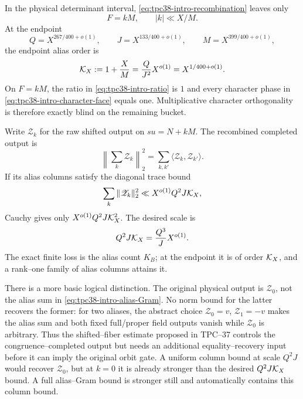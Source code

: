 In the physical determinant interval, \eqref{eq:tpc38-intro-recombination}
leaves only
\begin{equation}
 F=kM,\qquad |k|\ll X/M.
 \label{eq:tpc38-intro-joint-aliases}
\end{equation}
At the endpoint
\begin{equation}
 Q=X^{267/400+o(1)},\qquad
 J=X^{133/400+o(1)},\qquad
 M=X^{399/400+o(1)},
 \label{eq:tpc38-intro-endpoint}
\end{equation}
the endpoint alias order is
\begin{equation}
 \mathcal K_X:=1+\frac XM
 =\frac Q{J^2}X^{o(1)}
 =X^{1/400+o(1)}.
 \label{eq:tpc38-intro-KX}
\end{equation}
On \(F=kM\), the ratio in \eqref{eq:tpc38-intro-ratio} is \(1\) and every
character phase in \eqref{eq:tpc38-intro-character-face} equals one.
Multiplicative character orthogonality is therefore exactly blind on the
remaining bucket.

Write \(\mathscr Z_k\) for the raw shifted output on
\(su=N+kM\).  The recombined completed output is
\begin{equation}
 \left\|\sum_k\mathscr Z_k\right\|_2^2
 =\sum_{k,k'}\langle\mathscr Z_k,\mathscr Z_{k'}\rangle.
 \label{eq:tpc38-intro-alias-Gram}
\end{equation}
If its alias columns satisfy the diagonal trace bound
\begin{equation}
 \sum_k\|\mathscr Z_k\|_2^2
 \ll X^{o(1)}Q^2J\mathcal K_X,
 \label{eq:tpc38-intro-diagonal-input}
\end{equation}
Cauchy gives only \(X^{o(1)}Q^2J\mathcal K_X^2\).  The desired scale is
\begin{equation}
 Q^2J\mathcal K_X=\frac{Q^3}{J}X^{o(1)}.
 \label{eq:tpc38-intro-target-scale}
\end{equation}
The exact finite loss is the alias count \(K_B\); at the endpoint it is of
order \(\mathcal K_X\), and a rank--one family of alias columns attains it.

There is a more basic logical distinction.  The original physical output
is \(\mathscr Z_0\), not the alias sum in
\eqref{eq:tpc38-intro-alias-Gram}.  No norm bound for the latter recovers
the former: for two aliases, the abstract choice
\(\mathscr Z_0=v\), \(\mathscr Z_1=-v\) makes the alias sum and both
fixed full/proper field outputs vanish while \(\mathscr Z_0\) is arbitrary.
Thus the shifted--fiber estimate proposed in TPC--37 controls the
congruence--completed output but needs an additional equality--recovery
input before it can imply the original orbit gate.  A uniform column bound
at scale \(Q^2J\) would recover \(\mathscr Z_0\), but at \(k=0\) it is
already stronger than the desired \(Q^2J\mathcal K_X\) bound.  A full alias--Gram
bound is stronger still and automatically contains this column bound.

